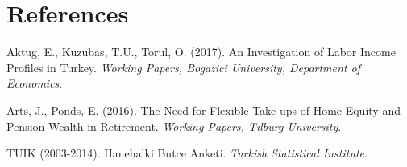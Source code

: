 \chapter*{References}

\begingroup
\singlespace
\begin{description}
\item Aktug, E., Kuzubas, T.U., Torul, O. (2017). An Investigation of Labor Income Profiles in Turkey. \textit{Working Papers, Bogazici University, Department of Economics}.
\item Arts, J., Ponds, E. (2016). The Need for Flexible Take-ups of Home Equity and Pension Wealth in Retirement. \textit{Working Papers, Tilburg University}.
\item TUIK (2003-2014). Hanehalki Butce Anketi. \textit{Turkish Statistical Institute}.
\end{description}
\endgroup
